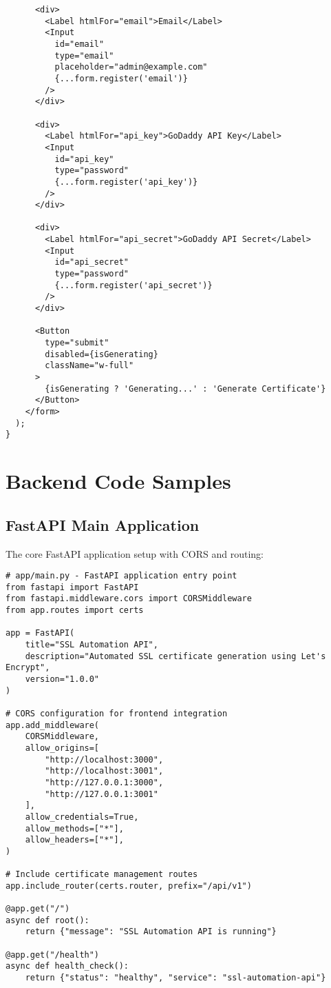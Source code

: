 \begin{verbatim}
      <div>
        <Label htmlFor="email">Email</Label>
        <Input
          id="email"
          type="email"
          placeholder="admin@example.com"
          {...form.register('email')}
        />
      </div>

      <div>
        <Label htmlFor="api_key">GoDaddy API Key</Label>
        <Input
          id="api_key"
          type="password"
          {...form.register('api_key')}
        />
      </div>

      <div>
        <Label htmlFor="api_secret">GoDaddy API Secret</Label>
        <Input
          id="api_secret"
          type="password"
          {...form.register('api_secret')}
        />
      </div>

      <Button 
        type="submit" 
        disabled={isGenerating}
        className="w-full"
      >
        {isGenerating ? 'Generating...' : 'Generate Certificate'}
      </Button>
    </form>
  );
}
\end{verbatim}

\section{Backend Code Samples}

\subsection{FastAPI Main Application}

The core FastAPI application setup with CORS and routing:

\begin{verbatim}
# app/main.py - FastAPI application entry point
from fastapi import FastAPI
from fastapi.middleware.cors import CORSMiddleware
from app.routes import certs

app = FastAPI(
    title="SSL Automation API",
    description="Automated SSL certificate generation using Let's Encrypt",
    version="1.0.0"
)

# CORS configuration for frontend integration
app.add_middleware(
    CORSMiddleware,
    allow_origins=[
        "http://localhost:3000",
        "http://localhost:3001",
        "http://127.0.0.1:3000",
        "http://127.0.0.1:3001"
    ],
    allow_credentials=True,
    allow_methods=["*"],
    allow_headers=["*"],
)

# Include certificate management routes
app.include_router(certs.router, prefix="/api/v1")

@app.get("/")
async def root():
    return {"message": "SSL Automation API is running"}

@app.get("/health")
async def health_check():
    return {"status": "healthy", "service": "ssl-automation-api"}
\end{verbatim}

